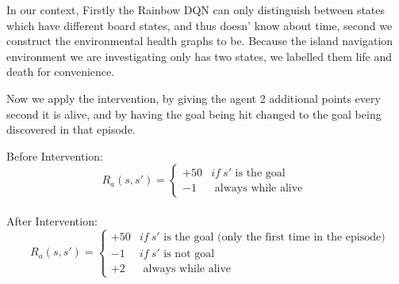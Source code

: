 \documentclass[12pt]{memoir}
\begin{document}
In our context, Firstly the Rainbow DQN can only distinguish between states which have different board states, and thus doesn’ know about time, second we construct the environmental  health graphs to be. Because the island navigation environment we are investigating only has two states, we labelled them life and death for convenience. \\
\begin{center}
\end{center}

 Now we apply the intervention, by giving the agent 2 additional points every second it is alive, and by having the goal being hit changed to the goal being discovered in that episode. 
 \begin{multicols}{2}
 	Before Intervention: \\
 $$ R_a(s,s') =  \begin{cases}
 +50 & if \:  s' \textrm{ is the goal } \\ 
 -1    &  \textrm{ always while alive }
 \end{cases} $$
  \columnbreak
   \\
   After Intervention: \\
   $$\quad R_a(s,s') = \begin{cases}
   +50 & if \: s' \textrm{ is the goal (only the first time in the episode) } \\ 
   -1    & if \: s' \textrm{ is not goal } \\  
   +2   & \textrm{ always while alive }
    \end{cases} $$
\end{multicols}
\end{document}
